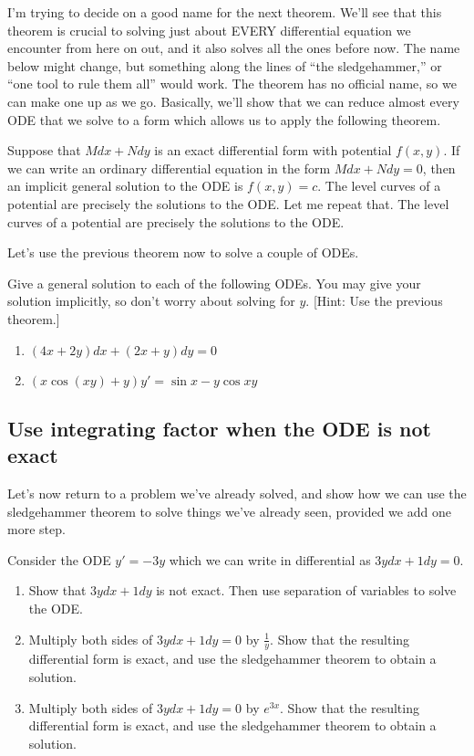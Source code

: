 I'm trying to decide on a good name for the next theorem.  We'll see that this theorem is crucial to solving just about EVERY differential equation we encounter from here on out, and it also solves all the ones before now. The name below might change, but something along the lines of ``the sledgehammer,'' or ``one tool to rule them all'' would work. The theorem has no official name, so we can make one up as we go. Basically, we'll show that we can reduce almost every ODE that we solve to a form which allows us to apply the following theorem.
\begin{theorem}
 Suppose that $Mdx+Ndy$ is an exact differential form with potential $f(x,y)$.  If we can write an ordinary differential equation in the form $Mdx+Ndy=0$, then an implicit general solution to the ODE is $f(x,y)=c$. The level curves of a potential are precisely the solutions to the ODE. Let me repeat that. The level curves of a potential are precisely the solutions to the ODE.
\end{theorem}

Let's use the previous theorem now to solve a couple of ODEs.
\begin{problem}
 Give a general solution to each of the following ODEs. You may give your solution implicitly, so don't worry about solving for $y$. [Hint: Use the previous theorem.]
\begin{enumerate}
 \item $(4x+2y)dx+(2x+y)dy=0$
 \item $(x\cos(xy)+y)y'=\sin x-y\cos xy$
\end{enumerate}
\end{problem}


\subsection{Use integrating factor when the ODE is not exact}
Let's now return to a problem we've already solved, and show how we can use the sledgehammer theorem to solve things we've already seen, provided we add one more step.
\begin{problem}\label{integrating factor introduction}
 Consider the ODE $y'=-3y$ which we can write in differential as $3ydx+1dy=0.$
\begin{enumerate}
 \item Show that $3ydx+1dy$ is not exact. Then use separation of variables to solve the ODE.
 \item Multiply both sides of  $3ydx+1dy=0$ by $\frac{1}{y}$.  Show that the resulting differential form is exact, and use the sledgehammer theorem to obtain a solution.
 \item Multiply both sides of  $3ydx+1dy=0$ by $e^{3x}$.  Show that the resulting differential form is exact, and use the sledgehammer theorem to obtain a solution.  
\end{enumerate}
\end{problem}

